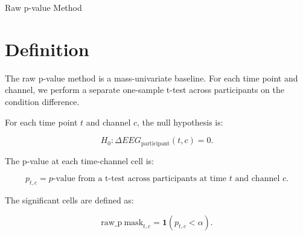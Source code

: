 \documentclass[11pt]{article}
\begin{document}
\begin{center}
{\LARGE Raw p-value Method}
\end{center}

\section*{Definition}

The raw p-value method is a mass-univariate baseline. For each time point and
channel, we perform a separate one-sample t-test across participants on the
condition difference.

For each time point \(t\) and channel \(c\), the null hypothesis is:

\[
H_0: \Delta EEG_{\mathrm{participant}}(t, c) = 0.
\]

The p-value at each time-channel cell is:

\[
p_{t,c}
=
p\text{-value from a t-test across participants at time }t
\text{ and channel }c.
\]

The significant cells are defined as:

\[
\mathrm{raw\_p\ mask}_{t,c}
=
\mathbf{1}(p_{t,c} < \alpha).
\]
\end{document}
